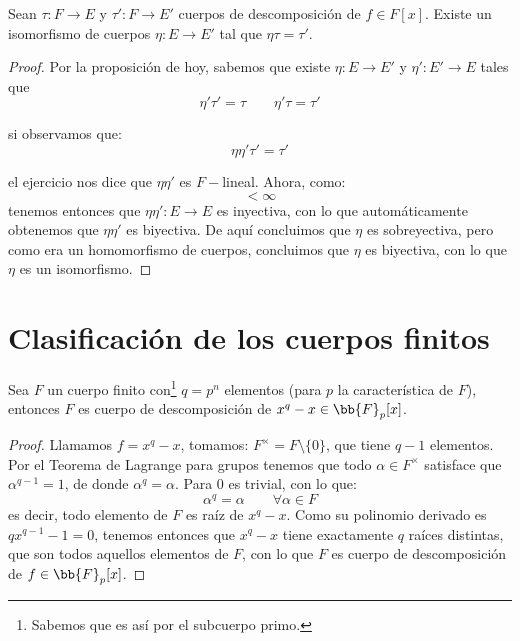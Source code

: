 \begin{teo}
    Sean $\tau:F\to E$ y $\tau':F\to E'$ cuerpos de descomposición de $f\in F[x]$. Existe un isomorfismo de cuerpos $\eta:E\to E'$ tal que $\eta \tau = \tau'$.
    \begin{proof}
        Por la proposición de hoy, sabemos que existe $\eta:E\to E'$ y $\eta':E'\to E$ tales que 
        \begin{equation*}
            \eta'\tau' = \tau\qquad \eta'\tau = \tau'
        \end{equation*}

        si observamos que:
        \begin{equation*}
            \eta\eta'\tau' = \tau'
        \end{equation*}

        el ejercicio nos dice que $\eta\eta'$ es $F-$lineal. Ahora, como:
        \begin{equation*}
            [E':\tau'(F)] < \infty
        \end{equation*}
        tenemos entonces que $\eta\eta':E\to E$ es inyectiva, con lo que automáticamente obtenemos que $\eta\eta'$ es biyectiva. De aquí concluimos que $\eta$ es sobreyectiva, pero como era un homomorfismo de cuerpos, concluimos que $\eta$ es biyectiva, con lo que $\eta$ es un isomorfismo.
    \end{proof}
\end{teo}

\section{Clasificación de los cuerpos finitos}
\begin{prop}
    Sea $F$ un cuerpo finito con\footnote{Sabemos que es así por el subcuerpo primo.} $q=p^n$ elementos (para $p$ la característica de $F$), entonces $F$ es cuerpo de descomposición de $x^q-x\in \bb{F}_p[x]$.
    \begin{proof}
        Llamamos $f=x^q-x$, tomamos: $F^{\times} = F\setminus\{0\}$, que tiene $q-1$ elementos. Por el Teorema de Lagrange para grupos tenemos que todo $\alpha\in F^{\times}$ satisface que $\alpha^{q-1}=1$, de donde $\alpha^q = \alpha$. Para $0$ es trivial, con lo que:
        \begin{equation*}
            \alpha^q = \alpha \qquad \forall \alpha\in F
        \end{equation*}
        es decir, todo elemento de $F$ es raíz de $x^q-x$. Como su polinomio derivado es $qx^{q-1}-1 = 0$, tenemos entonces que $x^q-x$ tiene exactamente $q$ raíces distintas, que son todos aquellos elementos de $F$, con lo que $F$ es cuerpo de descomposición de $f\in \bb{F}_p[x]$.
    \end{proof}
\end{prop}
